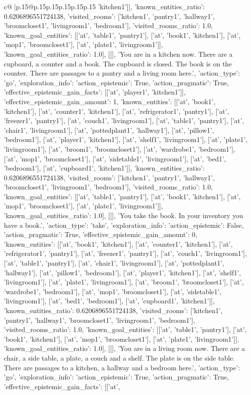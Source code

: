 \documentclass{article}
\begin{document}
{\begin{supertabular}{c@{$\;$}|p{.15\linewidth}@{}p{.15\linewidth}p{.15\linewidth}p{.15\linewidth}p{.15\linewidth}p{.15\linewidth}}
{{{'kitchen1']], 'known_entities_ratio': 0.6206896551724138, 'visited_rooms': ['kitchen1', 'pantry1', 'hallway1', 'broomcloset1', 'livingroom1', 'bedroom1'], 'visited_rooms_ratio': 1.0, 'known_goal_entities': [['at', 'table1', 'pantry1'], ['at', 'book1', 'kitchen1'], ['at', 'mop1', 'broomcloset1'], ['at', 'plate1', 'livingroom1']], 'known_goal_entities_ratio': 1.0}}], [[], 'You are in a kitchen now. There are a cupboard, a counter and a book. The cupboard is closed. The book is on the counter. There are passages to a pantry and a living room here.', {'action_type': 'go', 'exploration_info': {'action_epistemic': True, 'action_pragmatic': True, 'effective_epistemic_gain_facts': [['at', 'player1', 'kitchen1']], 'effective_epistemic_gain_amount': 1, 'known_entities': [['at', 'book1', 'kitchen1'], ['at', 'counter1', 'kitchen1'], ['at', 'refrigerator1', 'pantry1'], ['at', 'freezer1', 'pantry1'], ['at', 'couch1', 'livingroom1'], ['at', 'table1', 'pantry1'], ['at', 'chair1', 'livingroom1'], ['at', 'pottedplant1', 'hallway1'], ['at', 'pillow1', 'bedroom1'], ['at', 'player1', 'kitchen1'], ['at', 'shelf1', 'livingroom1'], ['at', 'plate1', 'livingroom1'], ['at', 'broom1', 'broomcloset1'], ['at', 'wardrobe1', 'bedroom1'], ['at', 'mop1', 'broomcloset1'], ['at', 'sidetable1', 'livingroom1'], ['at', 'bed1', 'bedroom1'], ['at', 'cupboard1', 'kitchen1']], 'known_entities_ratio': 0.6206896551724138, 'visited_rooms': ['kitchen1', 'pantry1', 'hallway1', 'broomcloset1', 'livingroom1', 'bedroom1'], 'visited_rooms_ratio': 1.0, 'known_goal_entities': [['at', 'table1', 'pantry1'], ['at', 'book1', 'kitchen1'], ['at', 'mop1', 'broomcloset1'], ['at', 'plate1', 'livingroom1']], 'known_goal_entities_ratio': 1.0}}], [[], 'You take the book. In your inventory you have a book.', {'action_type': 'take', 'exploration_info': {'action_epistemic': False, 'action_pragmatic': True, 'effective_epistemic_gain_amount': 0, 'known_entities': [['at', 'book1', 'kitchen1'], ['at', 'counter1', 'kitchen1'], ['at', 'refrigerator1', 'pantry1'], ['at', 'freezer1', 'pantry1'], ['at', 'couch1', 'livingroom1'], ['at', 'table1', 'pantry1'], ['at', 'chair1', 'livingroom1'], ['at', 'pottedplant1', 'hallway1'], ['at', 'pillow1', 'bedroom1'], ['at', 'player1', 'kitchen1'], ['at', 'shelf1', 'livingroom1'], ['at', 'plate1', 'livingroom1'], ['at', 'broom1', 'broomcloset1'], ['at', 'wardrobe1', 'bedroom1'], ['at', 'mop1', 'broomcloset1'], ['at', 'sidetable1', 'livingroom1'], ['at', 'bed1', 'bedroom1'], ['at', 'cupboard1', 'kitchen1']], 'known_entities_ratio': 0.6206896551724138, 'visited_rooms': ['kitchen1', 'pantry1', 'hallway1', 'broomcloset1', 'livingroom1', 'bedroom1'], 'visited_rooms_ratio': 1.0, 'known_goal_entities': [['at', 'table1', 'pantry1'], ['at', 'book1', 'kitchen1'], ['at', 'mop1', 'broomcloset1'], ['at', 'plate1', 'livingroom1']], 'known_goal_entities_ratio': 1.0}}], [[], 'You are in a living room now. There are a chair, a side table, a plate, a couch and a shelf. The plate is on the side table. There are passages to a kitchen, a hallway and a bedroom here.', {'action_type': 'go', 'exploration_info': {'action_epistemic': True, 'action_pragmatic': True, 'effective_epistemic_gain_facts': [['at', }}}
\end{supertabular}}
\end{document}
